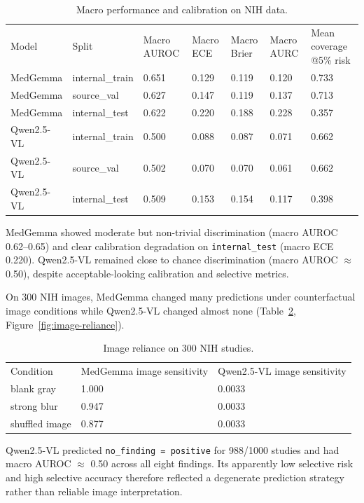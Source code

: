 \begin{table}[t]
\centering
\small
\begin{tabular}{lllllll}
\hline
Model & Split & Macro AUROC & Macro ECE & Macro Brier & Macro AURC & Mean coverage @5\% risk \\
MedGemma & internal\_train & 0.651 & 0.129 & 0.119 & 0.120 & 0.733 \\
MedGemma & source\_val & 0.627 & 0.147 & 0.119 & 0.137 & 0.713 \\
MedGemma & internal\_test & 0.622 & 0.220 & 0.188 & 0.228 & 0.357 \\
Qwen2.5-VL & internal\_train & 0.500 & 0.088 & 0.087 & 0.071 & 0.662 \\
Qwen2.5-VL & source\_val & 0.502 & 0.070 & 0.070 & 0.061 & 0.662 \\
Qwen2.5-VL & internal\_test & 0.509 & 0.153 & 0.154 & 0.117 & 0.398 \\
\hline
\end{tabular}
\caption{Macro performance and calibration on NIH data.}
\label{tab:main}
\end{table}

MedGemma showed moderate but non-trivial discrimination (macro AUROC 0.62--0.65)
and clear calibration degradation on \texttt{internal\_test} (macro ECE 0.220).
Qwen2.5-VL remained close to chance discrimination (macro AUROC $\approx$ 0.50),
despite acceptable-looking calibration and selective metrics.

On 300 NIH images, MedGemma changed many predictions under counterfactual image
conditions while Qwen2.5-VL changed almost none (Table~\ref{tab:image-reliance},
Figure~\ref{fig:image-reliance}).

\begin{table}[t]
\centering
\small
\begin{tabular}{lll}
\hline
Condition & MedGemma image sensitivity & Qwen2.5-VL image sensitivity \\
blank gray & 1.000 & 0.0033 \\
strong blur & 0.947 & 0.0033 \\
shuffled image & 0.877 & 0.0033 \\
\hline
\end{tabular}
\caption{Image reliance on 300 NIH studies.}
\label{tab:image-reliance}
\end{table}

Qwen2.5-VL predicted \texttt{no\_finding = positive} for 988/1000 studies and had
macro AUROC $\approx$ 0.50 across all eight findings. Its apparently low
selective risk and high selective accuracy therefore reflected a degenerate
prediction strategy rather than reliable image interpretation.


